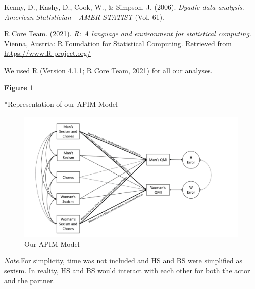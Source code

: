 \documentclass[
  english,
  man]{apa6}
\begin{document}
\begingroup
\setlength{\parindent}{-0.5in}
\setlength{\leftskip}{0.5in}

\hypertarget{refs}{}
\leavevmode\hypertarget{ref-Kenny}{}%
Kenny, D., Kashy, D., Cook, W., \& Simpson, J. (2006). \emph{Dyadic data analysis}. \emph{American Statistician - AMER STATIST} (Vol. 61).

\leavevmode\hypertarget{ref-R-base}{}%
R Core Team. (2021). \emph{R: A language and environment for statistical computing}. Vienna, Austria: R Foundation for Statistical Computing. Retrieved from \url{https://www.R-project.org/}

\endgroup

We used R (Version 4.1.1; R Core Team, 2021) for all our analyses.

\newpage

\textbf{Figure 1}

*Representation of our APIM Model

\begin{figure}
\centering
\includegraphics{APIM.png}
\caption{Our APIM Model}
\end{figure}

\emph{Note.}For simplicity, time was not included and HS and BS were simplified as sexism. In reality, HS and BS would interact with each other for both the actor and the partner.
\end{document}

